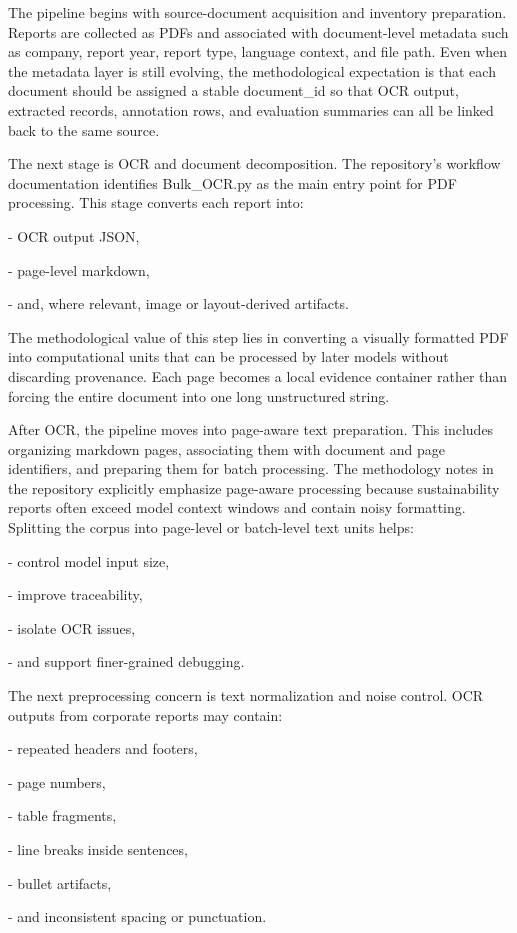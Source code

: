 \documentclass{article}
\begin{document}
The pipeline begins with source-document acquisition and inventory preparation. Reports are collected as PDFs and associated with document-level metadata such as company, report year, report type, language context, and file path. Even when the metadata layer is still evolving, the methodological expectation is that each document should be assigned a stable document\_id so that OCR output, extracted records, annotation rows, and evaluation summaries can all be linked back to the same source.

The next stage is OCR and document decomposition. The repository’s workflow documentation identifies Bulk\_OCR.py as the main entry point for PDF processing. This stage converts each report into:

- OCR output JSON,

- page-level markdown,

- and, where relevant, image or layout-derived artifacts.

The methodological value of this step lies in converting a visually formatted PDF into computational units that can be processed by later models without discarding provenance. Each page becomes a local evidence container rather than forcing the entire document into one long unstructured string.

After OCR, the pipeline moves into page-aware text preparation. This includes organizing markdown pages, associating them with document and page identifiers, and preparing them for batch processing. The methodology notes in the repository explicitly emphasize page-aware processing because sustainability reports often exceed model context windows and contain noisy formatting. Splitting the corpus into page-level or batch-level text units helps:

- control model input size,

- improve traceability,

- isolate OCR issues,

- and support finer-grained debugging.

The next preprocessing concern is text normalization and noise control. OCR outputs from corporate reports may contain:

- repeated headers and footers,

- page numbers,

- table fragments,

- line breaks inside sentences,

- bullet artifacts,

- and inconsistent spacing or punctuation.
\end{document}

